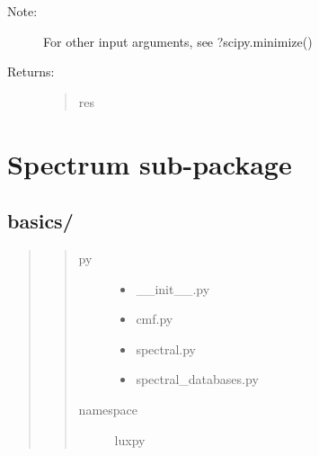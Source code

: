 \documentclass[letterpaper,10pt,english]{sphinxmanual}
\begin{document}
\begin{fulllineitems}
\begin{description}
\begin{quote}
\begin{description}
\end{description}\end{quote}

\item[{Note:}] \leavevmode
For other input arguments, see ?scipy.minimize()

\item[{Returns:}] \leavevmode\begin{quote}\begin{description}
\item[{res}] \leavevmode
{}

\end{description}\end{quote}

\end{description}

\end{fulllineitems}



\section{Spectrum sub-package}
\label{\detokenize{spectrum::doc}}\label{\detokenize{spectrum:spectrum-sub-package}}

\subsection{basics/}
\label{\detokenize{spectrum:basics}}\begin{quote}
\begin{quote}\begin{description}
\item[{py}] \leavevmode\begin{itemize}
\item {} 
\_\_init\_\_.py

\item {} 
cmf.py

\item {} 
spectral.py

\item {} 
spectral\_databases.py

\end{itemize}

\item[{namespace}] \leavevmode
luxpy

\end{description}\end{quote}
\end{quote}
\label{\detokenize{spectrum:module-luxpy.spectrum}}
\end{document}
